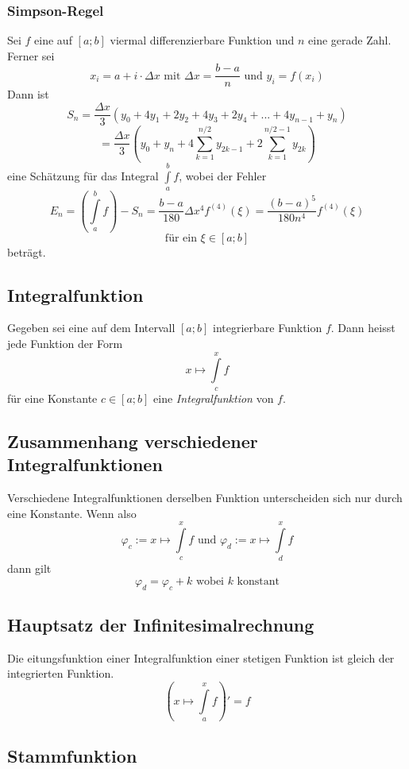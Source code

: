 \documentclass[10pt,a4paper]{scrartcl}
\begin{document}
\subsubsection{Simpson-Regel}

Sei $f$ eine auf $[a;b]$ viermal differenzierbare Funktion und $n$ eine gerade Zahl.
Ferner sei
$$x_i = a + i \cdot \Delta x \textrm{ mit } \Delta x = \frac{b-a}{n}
    \textrm{ und } y_i = f(x_i)$$
Dann ist
$$S_n = \frac{\Delta x}{3}(y_0 + 4y_1 + 2y_2 + 4y_3 + 2y_4 + ... + 4y_{n-1} + y_n)$$
$$= \frac{\Delta x}{3}\left(y_0 + y_n + 4 \sum_{k=1}^{n/2} y_{2k-1} 
    + 2 \sum_{k=1}^{n/2-1} y_{2k}\right)$$
eine Schätzung für das Integral $\int\limits_a^b f$, wobei der Fehler
$$E_n = \left(\int\limits_a^b f\right) - S_n = \frac{b-a}{180}\Delta x^4 f^{(4)}(\xi)
    = \frac{(b-a)^5}{180n^4} f^{(4)}(\xi)$$
$$\textrm{für ein } \xi \in [a;b]$$
beträgt.


\subsection{Integralfunktion}

Gegeben sei eine auf dem Intervall $[a;b]$ integrierbare Funktion $f$. Dann heisst
jede Funktion der Form
$$x \mapsto \int\limits_c^x f$$
für eine Konstante $c \in [a;b]$ eine \textit{Integralfunktion} von $f$.


\subsection{Zusammenhang verschiedener Integralfunktionen}

Verschiedene Integralfunktionen derselben Funktion unterscheiden sich nur durch
eine Konstante. Wenn also
$$\varphi_c := x \mapsto \int\limits_c^x f \textrm{ und } \varphi_d := x \mapsto
    \int\limits_d^x f$$
dann gilt
$$\varphi_d = \varphi_c + k \textrm{ wobei } k \textrm{ konstant}$$


\subsection{Hauptsatz der Infinitesimalrechnung}

Die eitungsfunktion einer Integralfunktion einer stetigen Funktion ist
gleich der integrierten Funktion.
$$\left(x \mapsto \int\limits_a^x f\right)' = f$$


\subsection{Stammfunktion}
\end{document}
